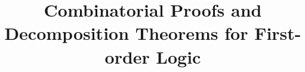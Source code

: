 \documentclass[conference,twosided,10pt]{IEEEtran}
\theoremstyle{definition}
\begin{document}
\vlnosmallleftlabels%
%
%
\title{Combinatorial Proofs and Decomposition Theorems for First-order Logic\vspace{-3ex}}





% 
\end{document}
